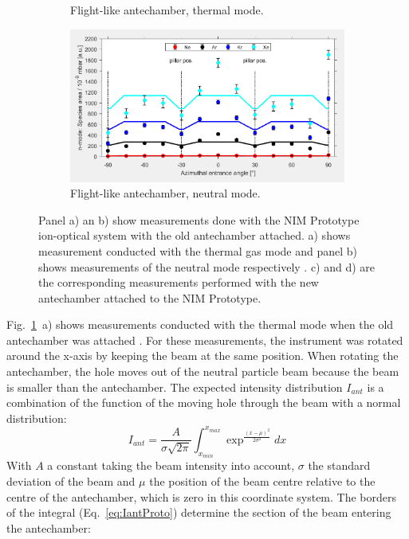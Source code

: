 \begin{figure}[h!]
\begin{subfigure}[b]{.5\textwidth}
			\caption{Flight-like antechamber, thermal mode.}
		\end{subfigure}
		\begin{subfigure}[b]{.5\textwidth}
			\centering
			\includegraphics[width=\textwidth]{Experiments/newAnte_NMode.png}
			\caption{Flight-like antechamber, neutral mode.}
		\end{subfigure}
		\caption{Panel a) an b) show measurements done with the NIM Prototype ion-optical system with the old antechamber attached. a) shows measurement conducted with the thermal gas mode and panel b) shows measurements of the neutral mode respectively \cite{Meyer_2017_ante}. c) and d) are the corresponding measurements performed with the new antechamber attached to the NIM Prototype.}
		\label{fig:AnteMeasData}
	\end{figure}
	Fig.~\ref{fig:AnteMeasData}~a) shows measurements conducted with the thermal mode when the old antechamber was attached \cite{Meyer_2017_ante}. For these measurements, the instrument was rotated around the x-axis by keeping the beam at the same position. When rotating the antechamber, the hole moves out of the neutral particle beam because the beam is smaller than the antechamber. The expected intensity distribution $I_{ant}$ is a combination of the function of the moving hole through the beam with a normal distribution:
	\begin{equation}
		I_{ant} = \frac{A}{\sigma\sqrt{2\pi}}\int_{x_{min}}^{x_{max}} \exp^{\frac{(x-\mu)^2}{2\sigma^2}} dx
		\label{eq:IantProto}
	\end{equation}
	With $A$ a constant taking the beam intensity into account, $\sigma$ the standard deviation of the beam and $\mu$ the position of the beam centre relative to the centre of the antechamber, which is zero in this coordinate system. The borders of the integral (Eq.~\eqref{eq:IantProto}) determine the section of the beam entering the antechamber:
